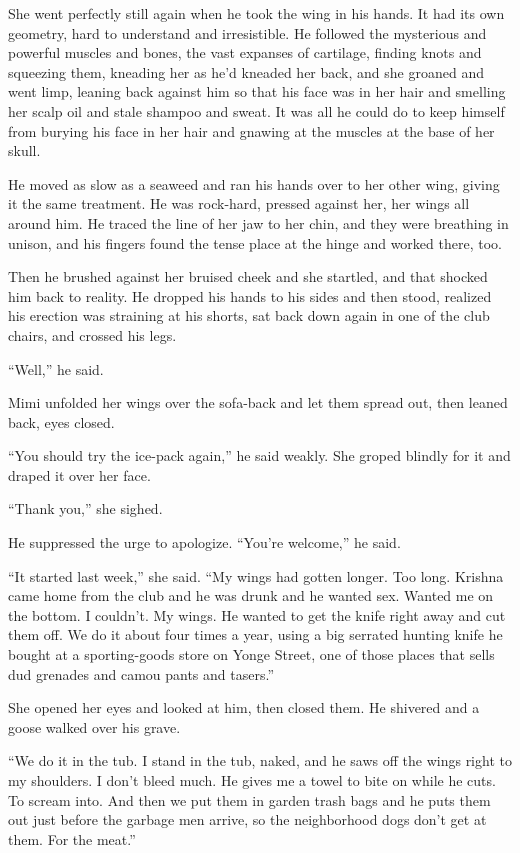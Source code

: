 She went perfectly still again when he took the wing in his hands.  It
had its own geometry, hard to understand and irresistible.  He
followed the mysterious and powerful muscles and bones, the vast
expanses of cartilage, finding knots and squeezing them, kneading her
as he'd kneaded her back, and she groaned and went limp, leaning back
against him so that his face was in her hair and smelling her scalp
oil and stale shampoo and sweat.  It was all he could do to keep
himself from burying his face in her hair and gnawing at the muscles
at the base of her skull.

He moved as slow as a seaweed and ran his hands over to her other
wing, giving it the same treatment.  He was rock-hard, pressed against
her, her wings all around him.  He traced the line of her jaw to her
chin, and they were breathing in unison, and his fingers found the
tense place at the hinge and worked there, too.

Then he brushed against her bruised cheek and she startled, and that
shocked him back to reality.  He dropped his hands to his sides and
then stood, realized his erection was straining at his shorts, sat
back down again in one of the club chairs, and crossed his legs.

``Well,'' he said.

Mimi unfolded her wings over the sofa-back and let them spread out,
then leaned back, eyes closed.

``You should try the ice-pack again,'' he said weakly.  She groped
blindly for it and draped it over her face.

``Thank you,'' she sighed.

He suppressed the urge to apologize.  ``You're welcome,'' he said.

``It started last week,'' she said.  ``My wings had gotten longer. 
Too long.  Krishna came home from the club and he was drunk and he
wanted sex.  Wanted me on the bottom.  I couldn't.  My wings.  He
wanted to get the knife right away and cut them off.  We do it about
four times a year, using a big serrated hunting knife he bought at a
sporting-goods store on Yonge Street, one of those places that sells
dud grenades and camou pants and tasers.''

She opened her eyes and looked at him, then closed them.  He shivered
and a goose walked over his grave.

``We do it in the tub.  I stand in the tub, naked, and he saws off the
wings right to my shoulders.  I don't bleed much.  He gives me a towel
to bite on while he cuts.  To scream into.  And then we put them in
garden trash bags and he puts them out just before the garbage men
arrive, so the neighborhood dogs don't get at them.  For the meat.''

